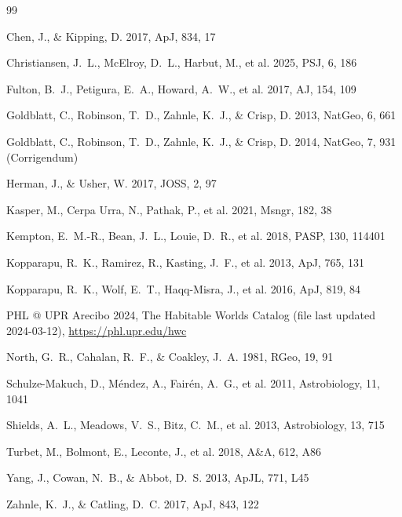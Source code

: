 \documentclass{aastex702}
\begin{document}
\begin{thebibliography}{99}

 Chen, J., \& Kipping, D. 2017, ApJ, 834, 17

 Christiansen, J.~L., McElroy, D.~L., Harbut, M., et al. 2025, PSJ, 6, 186

 Fulton, B.~J., Petigura, E.~A., Howard, A.~W., et al. 2017, AJ, 154, 109

 Goldblatt, C., Robinson, T.~D., Zahnle, K.~J., \& Crisp, D. 2013, NatGeo, 6, 661

 Goldblatt, C., Robinson, T.~D., Zahnle, K.~J., \& Crisp, D. 2014, NatGeo, 7, 931 (Corrigendum)

 Herman, J., \& Usher, W. 2017, JOSS, 2, 97

 Kasper, M., Cerpa Urra, N., Pathak, P., et al. 2021, Msngr, 182, 38

 Kempton, E.~M.-R., Bean, J.~L., Louie, D.~R., et al. 2018, PASP, 130, 114401

 Kopparapu, R.~K., Ramirez, R., Kasting, J.~F., et al. 2013, ApJ, 765, 131

 Kopparapu, R.~K., Wolf, E.~T., Haqq-Misra, J., et al. 2016, ApJ, 819, 84

 PHL @ UPR Arecibo 2024, The Habitable Worlds Catalog (file last updated 2024-03-12), \url{https://phl.upr.edu/hwc}

 North, G.~R., Cahalan, R.~F., \& Coakley, J.~A. 1981, RGeo, 19, 91

 Schulze-Makuch, D., M\'endez, A., Fair\'en, A.~G., et al. 2011, Astrobiology, 11, 1041

 Shields, A.~L., Meadows, V.~S., Bitz, C.~M., et al. 2013, Astrobiology, 13, 715

 Turbet, M., Bolmont, E., Leconte, J., et al. 2018, A\&A, 612, A86

 Yang, J., Cowan, N.~B., \& Abbot, D.~S. 2013, ApJL, 771, L45

 Zahnle, K.~J., \& Catling, D.~C. 2017, ApJ, 843, 122

\end{thebibliography}
\end{document}
